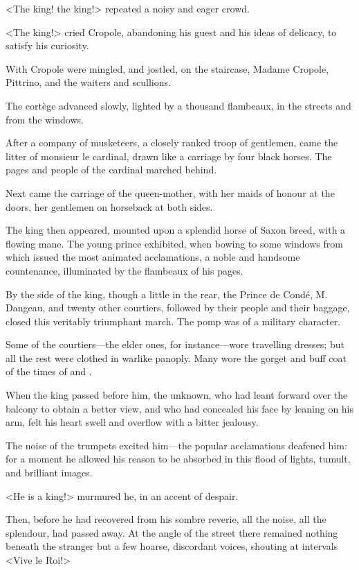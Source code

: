 <The king! the king!> repeated a noisy and eager crowd.

<The king!> cried Cropole, abandoning his guest and his ideas of delicacy, to satisfy his curiosity.

With Cropole were mingled, and jostled, on the staircase, Madame Cropole, Pittrino, and the waiters and scullions.

The cortège advanced slowly, lighted by a thousand flambeaux, in the streets and from the windows.

After a company of musketeers, a closely ranked troop of gentlemen, came the litter of monsieur le cardinal, drawn like a carriage by four black horses. The pages and people of the cardinal marched behind.

Next came the carriage of the queen-mother, with her maids of honour at the doors, her gentlemen on horseback at both sides.

The king then appeared, mounted upon a splendid horse of Saxon breed, with a flowing mane. The young prince exhibited, when bowing to some windows from which issued the most animated acclamations, a noble and handsome countenance, illuminated by the flambeaux of his pages.

By the side of the king, though a little in the rear, the Prince de Condé, M.~ Dangeau, and twenty other courtiers, followed by their people and their baggage, closed this veritably triumphant march. The pomp was of a military character.

Some of the courtiers—the elder ones, for instance—wore travelling dresses; but all the rest were clothed in warlike panoply. Many wore the gorget and buff coat of the times of  and .

When the king passed before him, the unknown, who had leant forward over the balcony to obtain a better view, and who had concealed his face by leaning on his arm, felt his heart swell and overflow with a bitter jealousy.

The noise of the trumpets excited him—the popular acclamations deafened him: for a moment he allowed his reason to be absorbed in this flood of lights, tumult, and brilliant images.

<He is a king!> murmured he, in an accent of despair.

Then, before he had recovered from his sombre reverie, all the noise, all the splendour, had passed away. At the angle of the street there remained nothing beneath the stranger but a few hoarse, discordant voices, shouting at intervals <Vive le Roi!>

